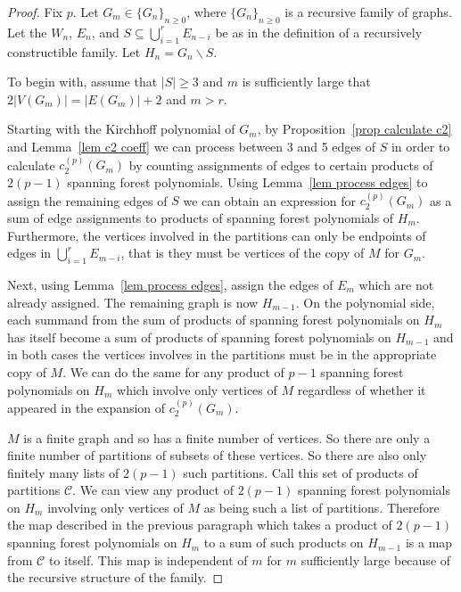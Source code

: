 \documentclass[12pt]{amsart}
\numberwithin{definition}{section}
\begin{document}
\begin{proof}
Fix $p$.
  Let $G_m\in \{G_n\}_{n\geq 0}$, where $\{G_n\}_{n\geq 0}$ is a recursive family of graphs.  Let the $W_n$, $E_n$, and $S\subseteq \bigcup_{i=1}^r E_{n-i}$ be as in the definition of a recursively constructible family.  Let $H_n = G_n \backslash S$.

To begin with, assume that $|S|\geq 3$ and $m$ is sufficiently large that $2|V(G_m)| = |E(G_m)| + 2$ and $m>r$.

Starting with the Kirchhoff polynomial of $G_m$, by Proposition~\ref{prop calculate c2} and Lemma~\ref{lem c2 coeff} we can process between 3 and 5 edges of $S$ in order to calculate $c_2^{(p)}(G_m)$ by counting assignments of edges to certain products of $2(p-1)$ spanning forest polynomials.  Using Lemma~\ref{lem process edges} to assign the remaining edges of $S$ we can obtain an expression for $c_2^{(p)}(G_m)$ as a sum of edge assignments to products of spanning forest polynomials of $H_m$.  Furthermore, the vertices involved in the partitions can only be endpoints of edges in $\bigcup_{i=1}^r E_{m-i}$, that is they must be vertices of the copy of $M$ for $G_m$.

Next, using Lemma~\ref{lem process edges}, assign the edges of $E_m$ which are not already assigned.  The remaining graph is now $H_{m-1}$.  On the polynomial side, each summand from the sum of products of spanning forest polynomials on $H_m$ has itself become a sum of products of spanning forest polynomials on $H_{m-1}$ and in both cases the vertices involves in the partitions must be in the appropriate copy of $M$.  We can do the same for any product of $p-1$ spanning forest polynomials on $H_{m}$ which involve only vertices of $M$ regardless of whether it appeared in the expansion of $c_2^{(p)}(G_m)$.

$M$ is a finite graph and so has a finite number of vertices.  So there are only a finite number of partitions of subsets of these vertices.  So there are also only finitely many lists of $2(p-1)$ such partitions.  Call this set of products of partitions $\mathcal{C}$.  We can view any product of $2(p-1)$ spanning forest polynomials on $H_m$ involving only vertices of $M$ as being such a list of partitions.  Therefore the map described in the previous paragraph which takes a product of $2(p-1)$ spanning forest polynomials on $H_m$ to a sum of such products on $H_{m-1}$ is a map from $\mathcal{C}$ to itself.  This map is independent of $m$ for $m$ sufficiently large because of the recursive structure of the family.


\end{proof}
\end{document}
